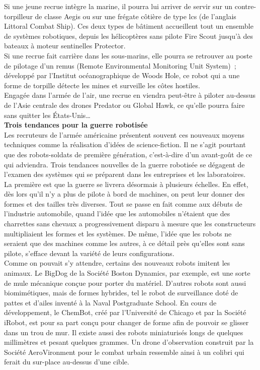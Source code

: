 \documentclass[8pt]{article}
\begin{document}
Si une jeune recrue intègre la marine, il pourra lui arriver de servir sur un contre-torpilleur de classe Aegis ou sur une frégate côtière de type lcs (de l’anglais Littoral Combat Ship). Ces deux types de bâtiment accueillent tout un ensemble de systèmes robotiques, depuis les hélicoptères sans pilote Fire Scout jusqu’à des bateaux à moteur sentinelles Protector.\\

Si une recrue fait carrière dans les sous-marins, elle pourra se retrouver au poste de pilotage d’un remus (Remote Environmental Monitoring Unit System)~; développé par l’Institut océanographique de Woods Hole, ce robot qui a une forme de torpille détecte les mines et surveille les côtes hostiles.\\

Engagée dans l’armée de l’air, une recrue en viendra peut-être à piloter au-dessus de l’Asie centrale des drones Predator ou Global Hawk, ce qu’elle pourra faire sans quitter les États-Unis…\\

\textbf{Trois tendances pour la guerre robotisée}\\

Les recruteurs de l’armée américaine présentent souvent ces nouveaux moyens techniques comme la réalisation d’idées de science-fiction. Il ne s’agit pourtant que des robots-soldats de première génération, c’est-à-dire d’un avant-goût de ce qui adviendra. Trois tendances nouvelles de la guerre robotisée se dégagent de l’examen des systèmes qui se préparent dans les entreprises et les laboratoires.\\

La première est que la guerre se livrera désormais à plusieurs échelles. En effet, dès lors qu’il n’y a plus de pilote à bord de machines, on peut leur donner des formes et des tailles très diverses. Tout se passe en fait comme aux débuts de l’industrie automobile, quand l’idée que les automobiles n’étaient que des charrettes sans chevaux a progressivement disparu à me­sure que les constructeurs multipliaient les formes et les systèmes. De même, l’idée que les robots ne seraient que des machines comme les autres, à ce détail près qu’elles sont sans pilote, s’efface devant la variété de leurs configurations.\\

Comme on pouvait s’y attendre, certains des nouveaux robots imitent les animaux. Le BigDog de la Société Boston Dynamics, par exemple, est une sorte de mule mécanique conçue pour porter du matériel. D’autres robots sont aussi biomimétiques, mais de formes hybrides, tel le robot de surveillance doté de pattes et d’ailes inventé à la Naval Postgraduate School. En cours de développement, le ChemBot, créé par l’Université de Chicago et par la Société iRobot, est pour sa part conçu pour changer de forme afin de pouvoir se glisser dans un trou de mur. Il existe aussi des robots miniaturisés longs de quelques millimètres et pesant quelques grammes. Un drone d’observation construit par la Société AeroVironment pour le combat urbain ressemble ainsi à un colibri qui ferait du sur-place au-dessus d’une cible.\\
\end{document}
